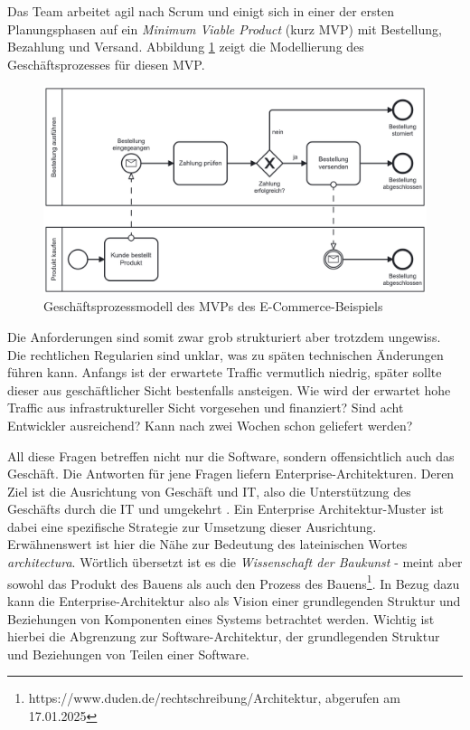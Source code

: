 \documentclass[acmtog]{acmart}
\begin{document}
Das Team arbeitet agil nach Scrum und einigt sich in einer der ersten Planungsphasen auf ein \textit{Minimum Viable Product} (kurz MVP) mit Bestellung, Bezahlung und Versand.
Abbildung \ref{fig:ecommerce-bpm} zeigt die Modellierung des Geschäftsprozesses für diesen MVP\@.
\begin{figure}[!h]
  \centering
  \includegraphics[width=\linewidth]{images/einleitung/ecommerce-order}
  \caption{Geschäftsprozessmodell des MVPs des E-Commerce-Beispiels}
  \label{fig:ecommerce-bpm}
\end{figure}
Die Anforderungen sind somit zwar grob strukturiert aber trotzdem ungewiss.
Die rechtlichen Regularien sind unklar, was zu späten technischen Änderungen führen kann.
Anfangs ist der erwartete Traffic vermutlich niedrig, später sollte dieser aus geschäftlicher Sicht bestenfalls ansteigen.
Wie wird der erwartet hohe Traffic aus infrastruktureller Sicht vorgesehen und finanziert?
Sind acht Entwickler ausreichend?
Kann nach zwei Wochen schon geliefert werden?

All diese Fragen betreffen nicht nur die Software, sondern offensichtlich auch das Geschäft.
Die Antworten für jene Fragen liefern Enterprise-Architekturen.
Deren Ziel ist die Ausrichtung von Geschäft und IT, also die Unterstützung des Geschäfts durch die IT und umgekehrt \cite{eaprinciples}.
Ein Enterprise Architektur-Muster ist dabei eine spezifische Strategie zur Umsetzung dieser Ausrichtung.
Erwähnenswert ist hier die Nähe zur Bedeutung des lateinischen Wortes \textit{architectura}.
Wörtlich übersetzt ist es die \textit{Wissenschaft der Baukunst} - meint aber sowohl das Produkt des Bauens als auch den Prozess des Bauens\footnote{https://www.duden.de/rechtschreibung/Architektur, abgerufen am 17.01.2025}.
In Bezug dazu kann die Enterprise-Architektur also als Vision einer grundlegenden Struktur und Beziehungen von Komponenten eines Systems betrachtet werden.
Wichtig ist hierbei die Abgrenzung zur Software-Architektur, der grundlegenden Struktur und Beziehungen von Teilen einer Software.
\end{document}
